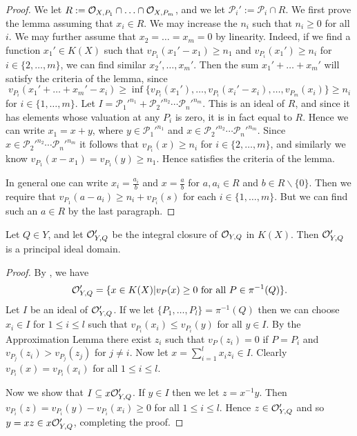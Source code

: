     \begin{proof}
    We let $R:= {\cal O}_{X,P_1} \cap \ldots \cap {\cal O}_{X,P_m}$, and we let $\mathcal{P}_i' := \mathcal{P}_i \cap R$.
    We first prove the lemma assuming that $x_i \in R$.
    We may increase the $n_i$ such that $n_i\geq 0$ for all $i$.
    We may further assume that $x_2 = \ldots = x_m =0$ by linearity.
    Indeed, if we find a function $x_1' \in K(X)$ such that $v_{P_1}(x_1' - x_1) \geq n_1$ and $v_{P_i}(x_1') \geq n_i$ for $i \in \{2, \ldots, m\}$, we can find similar $x_2', \ldots, x_m'$.
    Then the sum $x_1' + \ldots + x_m'$  will satisfy the criteria of the lemma, since
        \[
        v_{P_i}(x_1' + \ldots + x_m' - x_i) \geq \inf\{v_{P_i}(x_1'), \ldots,  v_{P_i}(x_i' - x_i), \ldots, v_{P_m}(x_i)\} \geq n_i
        \]  
    for $i \in \{1, \ldots, m\}$.
    Let $I = {\mathcal{P}_1'}^{n_1} + {\mathcal{P}_2'}^{n_2}\cdots {\mathcal{P}_n'}^{n_m}$.
    This is an ideal of $R$, and since it has elements whose valuation at any $P_i$ is zero, it is in fact equal to $R$.
    Hence we can write $x_1 = x + y$, where $y \in {\mathcal{P}_1'}^{n_1}$ and $x\in {\mathcal{P}_2'}^{n_2}\cdots {\mathcal{P}_n'}^{n_m}$.
    Since $x\in {\mathcal{P}_2'}^{n_2}\cdots {\mathcal{P}_n'}^{n_m}$ it follows that $v_{P_i}(x) \geq n_i$ for $i \in \{2, \ldots, m\}$, and similarly we know $v_{P_1}(x - x_1) = v_{P_1}(y) \geq n_1$.
    Hence satisfies the criteria of the lemma.
    
    In general one can write $x_i = \frac{a_i}{b}$ and $x = \frac{a}{b}$ for $a,a_i\in R$ and $b\in R\backslash \{0\}$.
    Then we require that $v_{P_1}(a-a_i) \geq n_i + v_{P_i}(s)$ for each $i \in \{1, \ldots, m\}$.
    But we can find such an $a \in R$ by the last paragraph.
    \end{proof}

    \begin{lem}\label{lemmapidlemma}
    Let $Q\in Y$, and let ${\cal O}_{Y,Q}'$ be the integral closure of ${\cal O}_{Y,Q}$ in $K(X)$.
    Then ${\cal O}_{Y,Q}'$ is a principal ideal domain.
    \end{lem}
    \begin{proof}
    By \cite[Cor. 3.3.5]{stichtenoth}, we have 
        \[
        \cO_{Y,Q}' = \{x\in K(X)|v_P(x) \geq 0 \ \text{for all} \ P\in \pi^{-1}(Q)\}.
        \]  
    Let $I$ be an ideal of ${\cal O}_{Y,Q}'$.
    If we let $\{P_1,\ldots, P_l\} = \pi^{-1}(Q)$ then we can choose $x_i \in I$ for $1\leq i \leq l$ such that $v_{P_i}(x_i) \leq v_{P_i}(y)$ for all $y\in I$.
    By the Approximation Lemma there exist $z_i$ such that $v_P (z_i) = 0$ if $P=P_i$ and $v_{P_j}(z_i) > v_{P_j}(z_j)$ for $j\neq i$.
    Now let $x = \sum_{i=1}^l x_iz_i \in I$.
    Clearly $v_{P_i}(x) = v_{P_i}(x_i)$ for all $1\leq i\leq l$.
    
    Now we show that $I \subseteq x{\cal O}_{Y,Q}'$.
    If $y\in I$ then we let $z = x^{-1}y$.
    Then $v_{P_i}(z) = v_{P_i}(y) - v_{P_i}(x_i) \geq 0$ for all $1\leq i\leq l$.
    Hence $z\in {\cal O}_{Y,Q}'$ and so $y = xz \in x{\cal O}_{Y,Q}'$, completing the proof.
    \end{proof}

